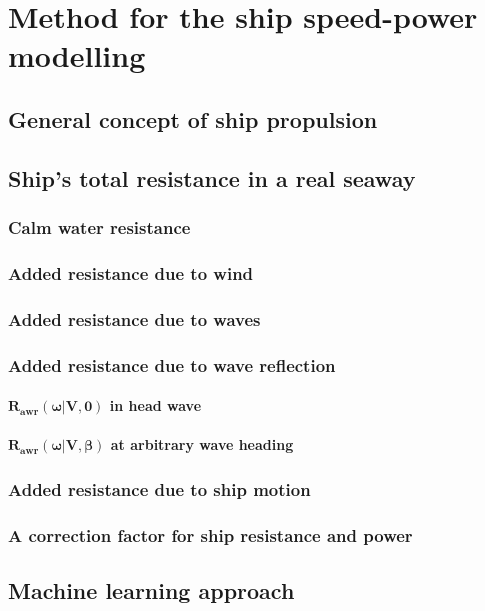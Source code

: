 
\chapter{Method for the ship speed-power modelling}\label{chapter:two}

\section{General concept of ship propulsion}
\label{Intro:sec:2-1}


\section{Ship's total resistance in a real seaway}

\subsection{Calm water resistance}


\subsection{Added resistance due to wind}



\subsection{Added resistance due to waves}





\subsection{Added resistance due to wave reflection}
\subsubsection{$\boldsymbol{R_{awr}(\omega| V, 0)}$ in head wave}
 
\subsubsection{$\boldsymbol{R_{awr}(\omega| V,  \beta)}$ at arbitrary wave heading}



\subsection{Added resistance due to ship motion}

\subsection{A correction factor for ship resistance and power}

\section{Machine learning approach}




 